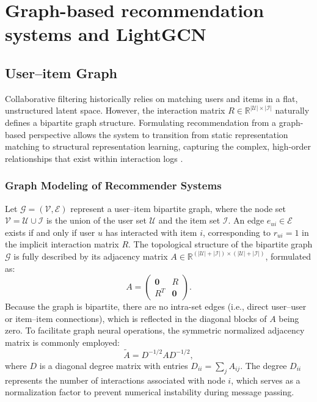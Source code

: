 \section{Graph-based recommendation systems and LightGCN}

\subsection{User--item Graph}

Collaborative filtering historically relies on matching users and items in a flat, unstructured latent space. However, the interaction matrix \(R \in \mathbb{R}^{|\mathcal{U}| \times |\mathcal{I}|}\) naturally defines a bipartite graph structure. Formulating recommendation from a graph-based perspective allows the system to transition from static representation matching to structural representation learning, capturing the complex, high-order relationships that exist within interaction logs \parencite{11359174}.

\subsubsection{Graph Modeling of Recommender Systems}

Let \(\mathcal{G} = (\mathcal{V}, \mathcal{E})\) represent a user--item bipartite graph, where the node set \(\mathcal{V} = \mathcal{U} \cup \mathcal{I}\) is the union of the user set \(\mathcal{U}\) and the item set \(\mathcal{I}\). An edge \(e_{ui} \in \mathcal{E}\) exists if and only if user \(u\) has interacted with item \(i\), corresponding to \(r_{ui} = 1\) in the implicit interaction matrix \(R\). The topological structure of the bipartite graph \(\mathcal{G}\) is fully described by its adjacency matrix \(A \in \mathbb{R}^{(|\mathcal{U}| + |\mathcal{I}|) \times (|\mathcal{U}| + |\mathcal{I}|)}\), formulated as:
\begin{equation}
    A = \begin{pmatrix}
        \mathbf{0} & R \\
        R^{T} & \mathbf{0}
    \end{pmatrix}.
    \label{eq:adjacency_matrix}
\end{equation}
Because the graph is bipartite, there are no intra-set edges (i.e., direct user--user or item--item connections), which is reflected in the diagonal blocks of \(A\) being zero. To facilitate graph neural operations, the symmetric normalized adjacency matrix is commonly employed:
\begin{equation}
    \tilde{A} = D^{-1/2} A D^{-1/2},
    \label{eq:norm_adjacency_matrix}
\end{equation}
where \(D\) is a diagonal degree matrix with entries \(D_{ii} = \sum_{j} A_{ij}\). The degree \(D_{ii}\) represents the number of interactions associated with node \(i\), which serves as a normalization factor to prevent numerical instability during message passing.

